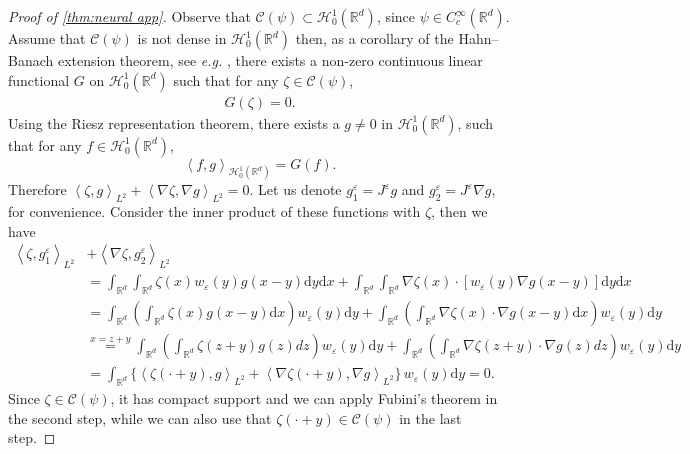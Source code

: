 \documentclass[11pt,a4paper,reqno]{amsart}
\numberwithin{equation}{section}
\theoremstyle{plain}
\theoremstyle{definition}
\def\e{{\varepsilon}}
\def\ud{\mathrm d}
\newcommand{\ip}[1]{\left\langle#1\right\rangle}
\newcommand{\R}{\mathbb{R}}
\begin{document}
\begin{proof}[Proof of \cref{thm:neural app}]
Observe that $\mathcal{C} \left(\psi\right) \subset \mathcal{H}_0^1 (\R^d)$, since $\psi \in C^\infty_c (\R^d)$. Assume that $\mathcal{C} \left(\psi\right)$ is not dense in $\mathcal{H}_0^1 (\R^d)$ then, as a corollary of the  Hahn--Banach extension theorem, see \textit{e.g.} \citet[Corollary 4.12]{Jan}, there exists a non-zero continuous linear functional $G$ on $\mathcal{H}_0^1 (\R^d)$ such that for any $\zeta \in \mathcal{C} \left(\psi\right)$,
\begin{align*}
 G \left( \zeta \right) = 0.
\end{align*}
Using the Riesz representation theorem, there exists a $g \ne 0$ in $\mathcal{H}_0^1 (\R^d)$, such that for any $f \in \mathcal{H}_0^1 (\R^d)$,
\[
 \ip{f, g}_{\mathcal{H}_0^1 (\R^d)} = G \left( f \right). 
 \]
Therefore $\ip{\zeta, g}_{L^2} + \ip{\nabla \zeta, \nabla g}_{L^2} = 0$. 
Let us denote $g^\e_1 = J^\e g$ and $g^\e_2 = J^\e \nabla g$, for convenience. 
Consider the inner product of these functions with $\zeta$, then we have
\begin{align*}
\ip{\zeta, g^\e_1}_{L^2} &+ \ip{\nabla \zeta, g^\e_2}_{L^2} \\ 
    &= \int_{\R^d} \int_{\R^d} \zeta (x) w_\e \left( y \right) g \left( x - y \right) \ud y \ud x + \int_{\R^d} \int_{\R^d} \nabla \zeta (x) \cdot \left[ w_\e \left( y \right) \nabla g \left( x - y \right) \right] \ud y \ud x \\ 
    &= \int_{\R^d} \left( \int_{\R^d} \zeta (x) g \left( x - y \right) \ud x \right) w_\e \left( y \right) \ud y + \int_{\R^d} \left( \int_{\R^d} \nabla \zeta (x) \cdot \nabla g \left( x - y \right) \ud x \right) w_\e \left( y \right) \ud y \\ 
    &\stackrel{x = z + y}{=}  \int_{\R^d} \left( \int_{\R^d} \zeta \left( z + y \right) g \left( z \right) dz \right) w_\e \left( y \right) \ud y + \int_{\R^d} \left( \int_{\R^d} \nabla \zeta \left( z + y \right) \cdot \nabla g \left( z \right) dz \right) w_\e \left( y \right) \ud y \\ 
    &=  \int_{\R^d} \Big\{ \ip{\zeta \left( \cdot + y \right), g}_{L^2} + \ip{\nabla \zeta \left( \cdot + y \right), \nabla g}_{L^2} \Big\} \, w_\e \left( y \right) \ud y = 0.
\end{align*}
Since $\zeta \in \mathcal{C} \left(\psi\right)$, it has compact support and we can apply Fubini's theorem in the second step, while we can also use that $\zeta \left( \cdot + y \right) \in \mathcal{C} \left(\psi\right)$ in the last step. 

\end{proof}
\end{document}
